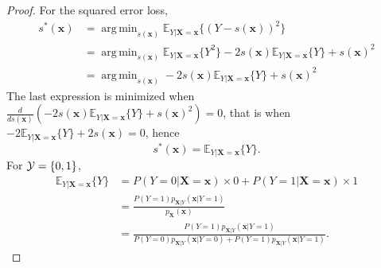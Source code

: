 \documentclass[12pt]{article}
\DeclareMathOperator*{\argmin}{arg\,min}
\numberwithin{equation}{section}
\theoremstyle{plain}
\begin{document}
\begin{proof}
For the squared error loss,
\begin{align}
s^*(\mathbf{x}) &= \argmin_{s(\mathbf{x})} \mathbb{E}_{Y|\mathbf{X}=\mathbf{x}} \{ (Y - s(\mathbf{x}))^2 \} \nonumber \\
&=  \argmin_{s(\mathbf{x})} \mathbb{E}_{Y|\mathbf{X}=\mathbf{x}} \{ Y^2 \} - 2s(\mathbf{x}) \mathbb{E}_{Y|\mathbf{X}=\mathbf{x}} \{ Y \} + s(\mathbf{x})^2 \nonumber \\
&=  \argmin_{s(\mathbf{x})} -2s(\mathbf{x}) \mathbb{E}_{Y|\mathbf{X}=\mathbf{x}} \{ Y \} + s(\mathbf{x})^2
\end{align}
The last expression is minimized when $\frac{d}{ds(\mathbf{x})} (-2s(\mathbf{x}) \mathbb{E}_{Y|\mathbf{X}=\mathbf{x}} \{ Y \} + s(\mathbf{x})^2) = 0$,
that is when $-2 \mathbb{E}_{Y|\mathbf{X}=\mathbf{x}} \{ Y \} + 2 s(\mathbf{x}) = 0$, hence
\begin{equation}
s^*(\mathbf{x}) = \mathbb{E}_{Y|\mathbf{X}=\mathbf{x}} \{ Y \}.
\end{equation}
For ${\cal Y} = \{ 0, 1 \}$,
\begin{align}
\mathbb{E}_{Y|\mathbf{X}=\mathbf{x}} \{ Y \} &= P(Y=0|\mathbf{X}=\mathbf{x}) \times 0 +  P(Y=1|\mathbf{X}=\mathbf{x}) \times 1 \nonumber \\
&= \frac{P(Y=1) p_{\mathbf{X}|Y}(\mathbf{x}|Y=1)}{p_{\mathbf{X}}(\mathbf{x})} \nonumber \\
&= \frac{P(Y=1) p_{\mathbf{X}|Y}(\mathbf{x}|Y=1)}{P(Y=0) p_{\mathbf{X}|Y}(\mathbf{x} | Y=0) + P(Y=1) p_{\mathbf{X}|Y}(\mathbf{x} | Y=1)}.
\end{align}
\end{proof}
\end{document}
